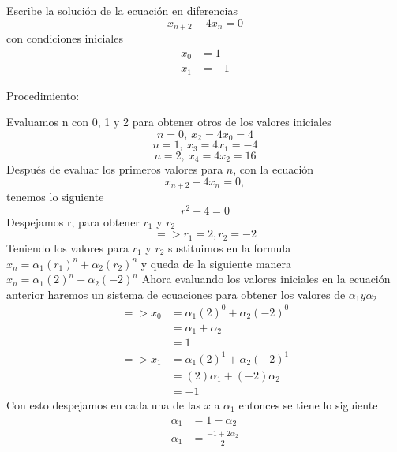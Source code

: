 \documentclass{article}
\begin{document}
Escribe la solución de la ecuación en diferencias
$$x_{n+2}-4x_n=0$$
con condiciones iniciales
\begin{align*}
  x_0&=1\\
  x_1&=-1
\end{align*}

\begin{center}
 Procedimiento:
\end{center}
Evaluamos n con 0, 1 y 2 para obtener otros de los valores iniciales\\
$$n=0, \ x_2=4x_0=4$$
$$n=1, \ x_3=4x_1=-4$$
$$n=2, \ x_4=4x_2=16$$
Después de evaluar los primeros valores para $n$, con la ecuación
$$x_{n+2}-4x_n=0,$$
tenemos lo siguiente
$$r^2-4=0$$
Despejamos r, para obtener $r_1$ y $r_2$\\
$$=> r_1=2, r_2=-2$$
Teniendo los valores para $r_1$ y $r_2$ sustituimos en la formula
$x_n=\alpha_1(r_1)^n+\alpha_2(r_2)^n$
y queda de la siguiente manera
$x_n=\alpha_1(2)^n+\alpha_2(-2)^n$
Ahora evaluando los valores iniciales en la ecuación anterior haremos un sistema de ecuaciones para obtener los valores de $\alpha_1 y \alpha_2$
\begin{align*}
  => x_0&=\alpha_1(2)^0+\alpha_2(-2)^0\\
        &=\alpha_1+\alpha_2\\
        &=1\\
  => x_1&=\alpha_1(2)^1+\alpha_2(-2)^1\\
        &=(2)\alpha_1+(-2)\alpha_2\\
        &=-1
\end{align*}
Con esto despejamos en cada una de las $x$ a $\alpha_1$ entonces se tiene lo siguiente
\begin{align*}
  \alpha_1&=1-\alpha_2\\
  \alpha_1&=\frac{-1+2\alpha_2}{2}
\end{align*}
\end{document}

